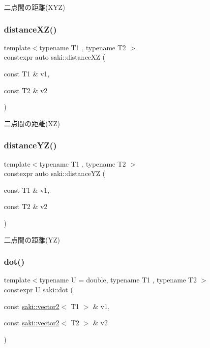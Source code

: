 二点間の距離(\+X\+Y\+Z) 

\mbox{\label{namespacesaki_a00cde91612dbac84d9720bf92a8ab9c6}} 
\subsubsection{\texorpdfstring{distance\+X\+Z()}{distanceXZ()}}
{\footnotesize\ttfamily template$<$typename T1 , typename T2 $>$ \\
constexpr auto saki\+::distance\+XZ (\begin{DoxyParamCaption}\item[{const T1 \&}]{v1,  }\item[{const T2 \&}]{v2 }\end{DoxyParamCaption})}



二点間の距離(\+X\+Z) 

\mbox{\label{namespacesaki_a59a95407d1eab774038224739436170d}} 
\subsubsection{\texorpdfstring{distance\+Y\+Z()}{distanceYZ()}}
{\footnotesize\ttfamily template$<$typename T1 , typename T2 $>$ \\
constexpr auto saki\+::distance\+YZ (\begin{DoxyParamCaption}\item[{const T1 \&}]{v1,  }\item[{const T2 \&}]{v2 }\end{DoxyParamCaption})}



二点間の距離(\+Y\+Z) 

\mbox{\label{namespacesaki_a820a45ae402c8447bce4fee36a1f7d62}} 
\subsubsection{\texorpdfstring{dot()}{dot()}\hspace{0.1cm}{\footnotesize\ttfamily [1/3]}}
{\footnotesize\ttfamily template$<$typename U  = double, typename T1 , typename T2 $>$ \\
constexpr U saki\+::dot (\begin{DoxyParamCaption}\item[{const \mbox{\hyperlink{classsaki_1_1vector2}{saki\+::vector2}}$<$ T1 $>$ \&}]{v1,  }\item[{const \mbox{\hyperlink{classsaki_1_1vector2}{saki\+::vector2}}$<$ T2 $>$ \&}]{v2 }\end{DoxyParamCaption})}



